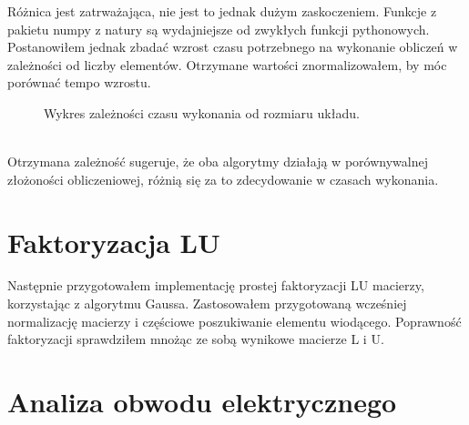 \documentclass{article}
\begin{document}
        Różnica jest zatrważająca, nie jest to jednak dużym zaskoczeniem. Funkcje z pakietu numpy z natury są wydajniejsze od zwykłych funkcji pythonowych. Postanowiłem jednak zbadać wzrost czasu potrzebnego na wykonanie obliczeń w zależności od liczby elementów. Otrzymane wartości znormalizowałem, by móc porównać tempo wzrostu.\\
        \begin{figure}[h!]
            \centering
            \caption{Wykres zależności czasu wykonania od rozmiaru układu.}
        \end{figure}\\
        Otrzymana zależność sugeruje, że oba algorytmy działają w porównywalnej złożoności obliczeniowej, różnią się za to zdecydowanie w czasach wykonania.\\
        
    \section{Faktoryzacja LU}
        Następnie przygotowałem implementację prostej faktoryzacji LU macierzy, korzystając z algorytmu Gaussa. Zastosowałem przygotowaną wcześniej normalizację macierzy i częściowe poszukiwanie elementu wiodącego. Poprawność faktoryzacji sprawdziłem mnożąc ze sobą wynikowe macierze L i U. 
         
        
    \section{Analiza obwodu elektrycznego}
        
        


    
\end{document}
